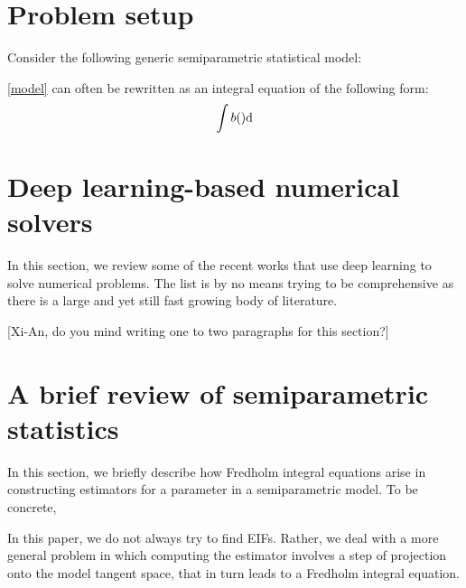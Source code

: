 \documentclass[11pt]{article}
\begin{document}
\section{Problem setup}
\label{sec:setup}

Consider the following generic semiparametric statistical model:
\begin{equation}
    \label{model}
\end{equation}

\eqref{model} can often be rewritten as an integral equation of the following form:
\begin{equation}
    \label{fredholm}
    \int b () \mathrm{d} 
\end{equation}

\section{Deep learning-based numerical solvers}
\label{sec:dnn-review}

In this section, we review some of the recent works that use deep learning to solve numerical problems. The list is by no means trying to be comprehensive as there is a large and yet still fast growing body of literature.

[Xi-An, do you mind writing one to two paragraphs for this section?]

\section{A brief review of semiparametric statistics}
\label{sec:semi-review}

In this section, we briefly describe how Fredholm integral equations arise in constructing estimators for a parameter in a semiparametric model. To be concrete, 

In this paper, we do not always try to find EIFs. Rather, we deal with a more general problem in which computing the estimator involves a step of projection onto the model tangent space, that in turn leads to a Fredholm integral equation.
\end{document}
